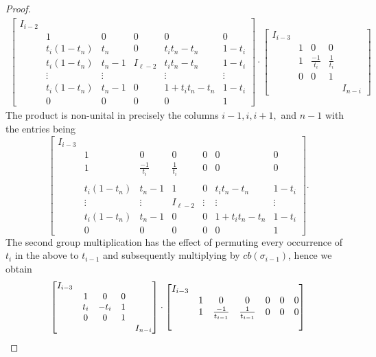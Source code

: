 \documentclass[11pt]{article}
\begin{document}
\begin{proof}
\begin{align*}
\begin{bmatrix}
			I_{i-2}&\\
			&1 & 0 & 0 & 0&0\\
			&t_i(1-t_n)&t_n & 0 & t_it_n-t_n&1-t_i\\
			&t_i(1-t_n)&t_n-1 & I_{\ell-2} & t_it_n-t_n&1-t_i\\
			&\vdots &\vdots & & \vdots&\vdots \\
			&t_i(1-t_n)&t_n-1 & 0 & 1+t_it_n-t_n &1-t_i\\
			& 0& 0& 0& 0& 1	
		\end{bmatrix}\cdot
		\begin{bmatrix}
			I_{i-3} &  &  &  \\
			& 1 & 0 & 0\\
			& 1& \frac{-1}{t_i} & \frac{1}{t_i}\\
			& 0 & 0 & 1 \\
			& & & & I_{n-i}
		\end{bmatrix}
	\end{align*}
	The product is non-unital in precisely the columns $i-1,i,i+1,$ and $n-1$ with the entries being
	$$\begin{bmatrix}
		I_{i-3}& \\
		&1 & 0 & 0  & 0 & 0 & 0\\
		&1& \frac{-1}{t_i} & \frac{1}{t_i} & 0 & 0 &0\\\\
		&t_i(1-t_n)&t_n-1 & 1 & 0 &t_it_n-t_n&1-t_i\\
		&\vdots & \vdots & I_{\ell-2}&\vdots & \vdots &\vdots \\
		&t_i(1-t_n)&t_n-1 & 0 & 0 & 1+t_it_n-t_n &1-t_i\\
		&0& 0& 0& 0& 0& 1
	\end{bmatrix}.$$
	The second group multiplication has the effect of permuting every occurrence of 
	$t_i$ in the above to $t_{i-1}$ and subsequently multiplying by $cb(\sigma_{i-1})$, 
	hence we obtain
	$${\small\begin{bmatrix}
			I_{i-3}\\
			&1& 0 & 0 \\
			&t_i & -t_i & 1\\
			&0 & 0 & 1\\
			& & & & I_{n-i}
	\end{bmatrix}}\cdot
	\begin{bmatrix}
		I_{i-3}& \\
		&1 & 0 & 0  & 0 & 0 & 0\\
		&1& \frac{-1}{t_{i-1}} & \frac{1}{t_{i-1}} & 0 & 0 &0\\\\

\end{bmatrix}$$
\end{proof}
\end{document}
